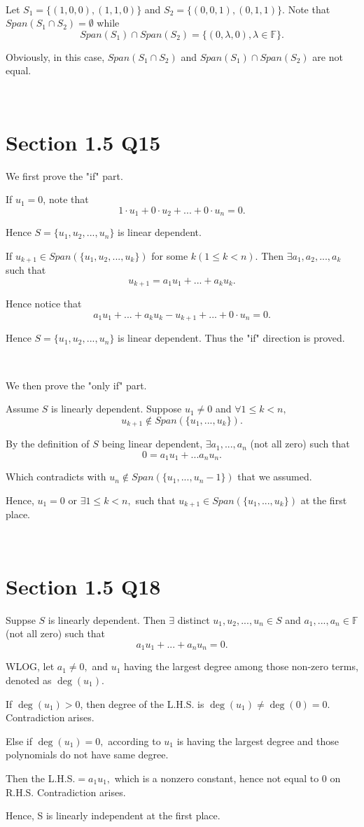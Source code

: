 \documentclass[12pt]{article}%
\begin{document}
~\ 

Let $S_1=\{(1,0,0),(1,1,0)\}$ and $S_2=\{(0,0,1),(0,1,1)\}.$ Note that $Span(S_1 \cap S_2)=\emptyset$ while $$Span(S_1) \cap Span(S_2)=\{(0,\lambda,0),\lambda\in \mathbb{F}\}.$$

Obviously, in this case, $Span(S_1 \cap S_2)$ and $Span(S_1) \cap Span(S_2)$ are not equal. 

~\ 

\section{Section 1.5 Q15}

We first prove the "if" part.

If $u_1=0$, note that $$1\cdot u_1+0\cdot u_2+...+0\cdot u_n=0.$$ 

Hence $S=\{u_1,u_2,...,u_n\}$ is linear dependent. 

If $u_{k+1}\in Span(\{u_1,u_2,...,u_k\})$ for some $k (1 \leq k<n).$ Then $\exists a_1,a_2,...,a_k$ such that $$u_{k+1}=a_1u_1+...+a_ku_k.$$

Hence notice that $$a_1u_1+...+a_ku_k-u_{k+1}+...+0\cdot u_n=0.$$

Hence $S=\{u_1,u_2,...,u_n\}$ is linear dependent. Thus the "if" direction is proved. 

~\

We then prove the "only if" part.

Assume $S$ is linearly dependent. Suppose $u_1\neq 0$ and $\forall 1\leq k<n,$ $$u_{k+1}\notin Span(\{u_1,...,u_k\}).$$

By the definition of $S$ being linear dependent, $\exists a_1,...,a_n$ (not all zero) such that $$0=a_1u_1+...a_nu_n.$$

Which contradicts with $u_n \notin Span(\{u_1,...,u_n-1\})$ that we assumed. 

Hence, $u_1= 0$ or $\exists 1\leq k<n,$ such that $u_{k+1}\in Span(\{u_1,...,u_k\})$ at the first place.

~\ 

\section{Section 1.5 Q18}

Suppse $S$ is linearly dependent. Then $\exists$ distinct $u_1,u_2,...,u_n \in S$ and $a_1,...,a_n \in \mathbb{F}$ (not all zero) such that $$a_1u_1+...+a_nu_n=0.$$

WLOG, let $a_1 \neq 0,$ and $u_1$ having the largest degree among those non-zero terms, denoted as $\deg(u_1).$

If $\deg(u_1)>0$, then degree of the L.H.S. is $\deg(u_1) \neq \deg(0)=0.$ Contradiction arises. 

Else if $\deg(u_1)=0,$ according to $u_1$ is having the largest degree and those polynomials do not have same degree. 

Then the L.H.S.$=a_1u_1,$ which is a nonzero constant, hence not equal to 0 on R.H.S. Contradiction arises.

Hence, S is linearly independent at the first place.
\end{document}
